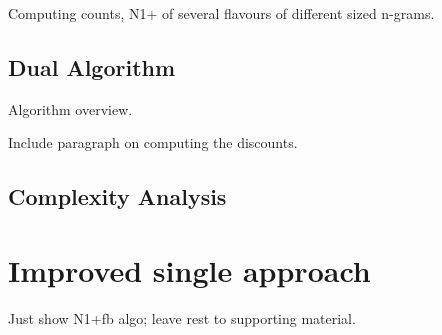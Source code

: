 
Computing counts, N1+ of several flavours of different sized n-grams.

\subsection{Dual \CST Algorithm} 

Algorithm overview.

Include paragraph on computing the discounts.

\subsection{Complexity Analysis}

\section{Improved single \CST approach}

Just show N1+fb algo; leave rest to supporting material.